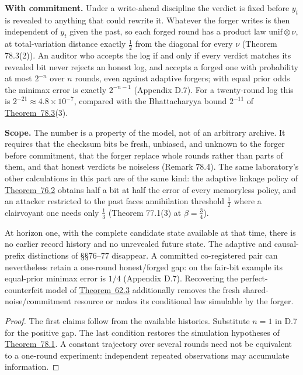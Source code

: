 \textbf{With commitment.} Under a write-ahead discipline the verdict is fixed before \(y_t\) is revealed to anything that could rewrite it. Whatever the forger writes is then independent of \(y_t\) given the past, so each forged round has a product law \(\mathrm{unif}\otimes\nu\), at total-variation distance exactly \(\tfrac12\) from the diagonal for every \(\nu\) (Theorem 78.3(2)). An auditor who accepts the log if and only if every verdict matches its revealed bit never rejects an honest log, and accepts a forged one with probability at most \(2^{-n}\) over \(n\) rounds, even against adaptive forgers; with equal prior odds the minimax error is exactly \(2^{-n-1}\) (Appendix D.7). For a twenty-round log this is \(2^{-21}\approx 4.8\times10^{-7}\), compared with the Bhattacharyya bound \(2^{-11}\) of \hyperlink{stmt:78.3}{Theorem~78.3}(3).

\textbf{Scope.} The number is a property of the model, not of an arbitrary archive. It requires that the checksum bits be fresh, unbiased, and unknown to the forger before commitment, that the forger replace whole rounds rather than parts of them, and that honest verdicts be noiseless (Remark 78.4). The same laboratory's other calculations in this part are of the same kind: the adaptive linkage policy of \hyperlink{stmt:76.2}{Theorem~76.2} obtains half a bit at half the error of every memoryless policy, and an attacker restricted to the past faces annihilation threshold \(\tfrac12\) where a clairvoyant one needs only \(\tfrac13\) (Theorem 77.1(3) at \(\beta=\tfrac34\)).


\begin{thmplain}

At horizon one, with the complete candidate state available at that time, there is no earlier record history and no unrevealed future state. The adaptive and causal-prefix distinctions of §§76--77 disappear. A committed co-registered pair can nevertheless retain a one-round honest/forged gap: on the fair-bit example its equal-prior minimax error is \(1/4\) (Appendix D.7). Recovering the perfect-counterfeit model of \hyperlink{stmt:62.3}{Theorem~62.3} additionally removes the fresh shared-noise/commitment resource or makes its conditional law simulable by the forger.
\end{thmplain}

\begin{proof}

The first claims follow from the available histories. Substitute \(n=1\) in D.7 for the positive gap. The last condition restores the simulation hypotheses of \hyperlink{stmt:78.1}{Theorem~78.1}. A constant trajectory over several rounds need not be equivalent to a one-round experiment: independent repeated observations may accumulate information.
\end{proof}

